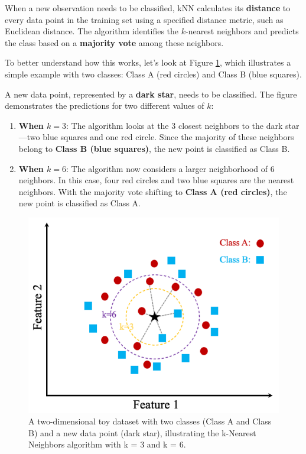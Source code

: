 \documentclass[
]{book}
\providecommand{\tightlist}{%
  \setlength{\itemsep}{0pt}\setlength{\parskip}{0pt}}
\theoremstyle{definition}
\theoremstyle{definition}
\theoremstyle{definition}
\theoremstyle{definition}
\theoremstyle{remark}
\begin{document}
When a new observation needs to be classified, kNN calculates its \textbf{distance} to every data point in the training set using a specified distance metric, such as Euclidean distance. The algorithm identifies the \(k\)-nearest neighbors and predicts the class based on a \textbf{majority vote} among these neighbors.

To better understand how this works, let's look at Figure \ref{fig:knn-image}, which illustrates a simple example with two classes: {Class A (red circles)} and {Class B (blue squares)}.

A new data point, represented by a \textbf{dark star}, needs to be classified. The figure demonstrates the predictions for two different values of \(k\):

\begin{enumerate}
\def\labelenumi{\arabic{enumi}.}
\tightlist
\item
  \textbf{When \(k = 3\)}: The algorithm looks at the 3 closest neighbors to the dark star---two blue squares and one red circle. Since the majority of these neighbors belong to \textbf{Class B (blue squares)}, the new point is classified as Class B.\\
\item
  \textbf{When \(k = 6\)}: The algorithm now considers a larger neighborhood of 6 neighbors. In this case, four red circles and two blue squares are the nearest neighbors. With the majority vote shifting to \textbf{Class A (red circles)}, the new point is classified as Class A.
\end{enumerate}

\begin{figure}

{\centering \includegraphics[width=0.75\linewidth]{images/knn} 

}

\caption{A two-dimensional toy dataset with two classes (Class A and Class B) and a new data point (dark star), illustrating the k-Nearest Neighbors algorithm with k = 3 and k = 6.}\label{fig:knn-image}
\end{figure}
\end{document}
